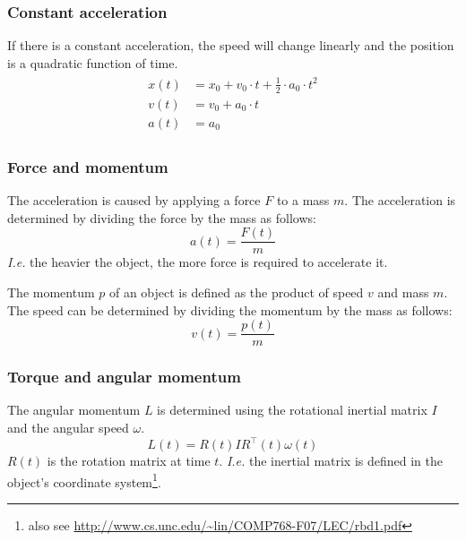 \documentclass[12pt,a4paper,twoside]{article}
\begin{document}
\subsubsection{Constant acceleration}
If there is a constant acceleration, the speed will change linearly and the position is a quadratic function of time.
\begin{align*}
  \begin{split}
    x(t) & = x_0 + v_0 \cdot t + \frac{1}{2} \cdot a_0 \cdot t^2\\
    v(t) & = v_0 + a_0 \cdot t\\
    a(t) & = a_0
  \end{split}
\end{align*}

\subsubsection{Force and momentum}
The acceleration is caused by applying a force $F$ to a mass $m$.
The acceleration is determined by dividing the force by the mass as follows:
\begin{equation*}
  a(t)=\frac{F(t)}{m}
\end{equation*}
\emph{I.e.} the heavier the object, the more force is required to accelerate it.

The momentum $p$ of an object is defined as the product of speed $v$ and mass $m$.
The speed can be determined by dividing the momentum by the mass as follows:
\begin{equation*}
  v(t)=\frac{p(t)}{m}
\end{equation*}

\subsubsection{Torque and angular momentum}
The angular momentum $L$ is determined using the rotational inertial matrix $I$ and the angular speed $\omega$.
\begin{equation*}
  L(t) = R(t) I R^\top(t) \omega(t)
\end{equation*}
$R(t)$ is the rotation matrix at time $t$.
\emph{I.e.} the inertial matrix is defined in the object's coordinate system\footnote{also see \url{http://www.cs.unc.edu/~lin/COMP768-F07/LEC/rbd1.pdf}}.
\end{document}
